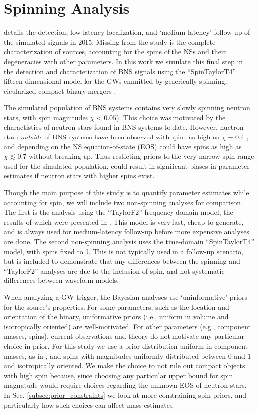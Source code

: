 \section{Spinning Analysis}
\label{sec:spin}

\citet{Singer_2014} details the detection, low-latency localization, and `medium-latency' follow-up of the simulated signals in 2015.  Missing from the study is the complete characterization of sources, accounting for the spins of the NSs and their degeneracies with other parameters.  In this work we simulate this final step in the detection and characterization of BNS signals using the ``SpinTaylorT4'' fifteen-dimensional model for the GWs emmitted by generically spinning, cicularized compact binary mergers \cite{Buonanno_2003,Buonanno_2009}. 

The simulated population of BNS systems contains very slowly spinning neutron stars, with spin magnitudes $\chi < 0.05$).  This choice was motivated by the charactistics of neutron stars found in BNS systems to date. However, nuetron stars \emph{outside} of BNS systems have been observed with spins as high as $\chi = 0.4$ \cite{Hessels_2006,Brown_2012}, and depending on the NS equation-of-state (EOS) could have spins as high as $\chi \lesssim 0.7$ \cite{Lo_2011} without breaking up.  Thus resticting priors to the very narrow spin range used for the simulated population, could result in significant biases in parameter estimates if neutron stars with higher spins exist.

Though the main purpose of this study is to quantify parameter estimates while accounting for spin, we will include two non-spinning analyses for comparison.  The first is the analysis using the ``TaylorF2'' frequency-domain model, the results of which were presented in \citet{Singer_2014}.  This model is very fast, cheap to generate, and is always used for medium-latency follow-up before more expensive analyses are done.  The second non-spinning analysis uses the time-domain ``SpinTaylorT4'' model, with spins fixed to 0.  This is not typically used in a follow-up scenario, but is included to demonstrate that any differences between the spinning and ``TaylorF2'' analyses are due to the inclusion of spin, and not systematic differences between waveform models.

When analyzing a GW trigger, the Bayesian analyses use `uninformative' priors for the source's properties.  For some parameters, such as the location and orientation of the binary, uniformative priors (i.e., uniform in volume and isotropically oriented) are well-motivated.  For other parameters (e.g., component masses, spins), current observations and theory do not motivate any particular choice in prior.  For this study we use a prior distribution uniform in component masses, as in \citet{2013arXiv1304.0670L}, and spins with magnitudes uniformly distributed between 0 and 1 and isotropically oriented.  We make the choice to not rule out compact objects with high spin because, since choosing any particular upper bound for spin magnatude would require choices regarding the unknown EOS of neutron stars.  In Sec. \ref{subsec:prior_constraints} we look at more constraining spin priors, and particularly how such choices can affect mass estimates.

